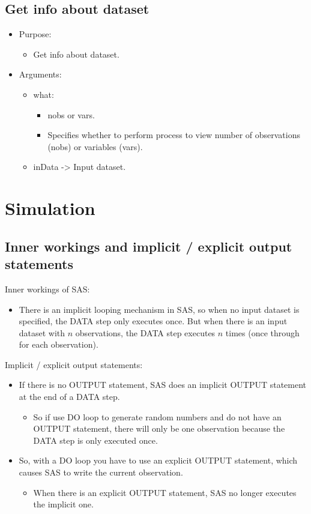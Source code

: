\documentclass[11pt, oneside]{article}
\begin{document}


\subsection{Get info about dataset}
\begin{itemize}
\item Purpose:
	\begin{itemize}
	\item Get info about dataset.
	\end{itemize}
\item Arguments:
	\begin{itemize}
	\item what:
		\begin{itemize}
		\item nobs or vars.
		\item Specifies whether to perform process to view number of observations (nobs) or variables (vars).
		\end{itemize}
	\item inData -> Input dataset.
	\end{itemize}
\end{itemize}



\section{Simulation}

\subsection{Inner workings and implicit / explicit output statements}

Inner workings of SAS:
\begin{itemize}
\item There is an implicit looping mechanism in SAS, so when no input dataset is specified, the DATA step only executes once. But when there is an input dataset with $n$ observations, the DATA step executes $n$ times (once through for each observation).
\end{itemize}

Implicit / explicit output statements:
\begin{itemize}
\item If there is no OUTPUT statement, SAS does an implicit OUTPUT statement at the end of a DATA step.
	\begin{itemize}
	\item So if use DO loop to generate random numbers and do not have an OUTPUT statement, there will only be one observation because the DATA step is only executed once.
	\end{itemize}
\item So, with a DO loop you have to use an explicit OUTPUT statement, which causes SAS to write the current observation.
	\begin{itemize}
	\item When there is an explicit OUTPUT statement, SAS no longer executes the implicit one.
	\end{itemize}
\end{itemize}
\end{document}
